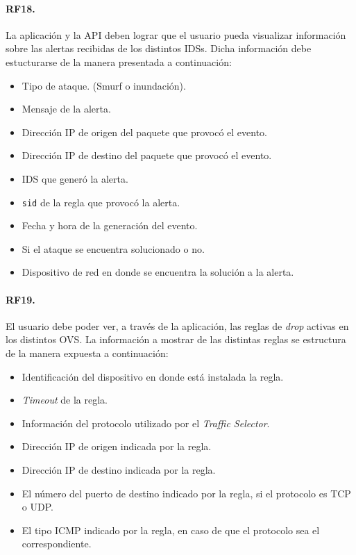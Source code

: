 \paragraph{RF18.} La aplicación y la API deben lograr que el usuario pueda visualizar información sobre las alertas recibidas de los distintos IDSs. Dicha información debe estucturarse de la manera presentada a continuación:
\begin{itemize}
	\item{Tipo de ataque. (Smurf o inundación).}
	\item{Mensaje de la alerta.}
	\item{Dirección IP de origen del paquete que provocó el evento.}
	\item{Dirección IP de destino del paquete que provocó el evento.}
	\item{IDS que generó la alerta.}
	\item{\verb|sid| de la regla que provocó la alerta.}
	\item{Fecha y hora de la generación del evento.}
	\item{Si el ataque se encuentra solucionado o no.}
	\item{Dispositivo de red en donde se encuentra la solución a la alerta.}
\end{itemize}

\paragraph{RF19.} El usuario debe poder ver, a través de la aplicación, las reglas de \textit{drop} activas en los distintos OVS. La información a mostrar de las distintas reglas se estructura de la manera expuesta a continuación:
\begin{itemize}
\item {Identificación del dispositivo en donde está instalada la regla.}
\item {\textit{Timeout} de la regla.}
\item {Información del protocolo utilizado por el \textit{Traffic Selector}.}
\item {Dirección IP de origen indicada por la regla.}
\item {Dirección IP de destino indicada por la regla.}
\item {El número del puerto de destino indicado por la regla, si el protocolo es TCP o UDP.}
\item {El tipo ICMP indicado por la regla, en caso de que el protocolo sea el correspondiente.}
\end{itemize}

